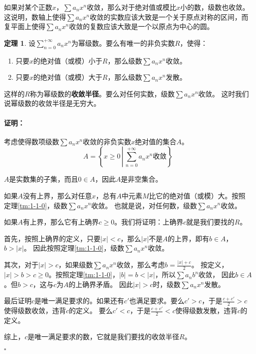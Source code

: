 \documentclass[12pt,UTF8]{ctexbook}
\theoremstyle{definition}
\newtheorem{tm}{定理}[section]
\theoremstyle{plain}
\renewenvironment{proof}{\paragraph{\textbf{证明：}}}{\hfill$\square$}
\begin{document}
如果对某个正数$x$，$\sum a_n x^n$收敛，那么对于绝对值或模比$x$小的数，级数也收敛。
这说明，数轴上使得$\sum a_n x^n$收敛的实数应该大致是一个关于原点对称的区间，而复平面上使得$\sum a_n x^n$收敛的复数应该大致是一个以原点为中心的圆。

\begin{tm}\label{tm:1-1-10}
    设$\displaystyle\sum_{n=0}^{+\infty} a_n x^n$为幂级数。要么有唯一的非负实数$R$，使得：
    \begin{enumerate}
        \item 只要$x$的绝对值（或模）小于$R$，那么级数$\sum a_n x^n$收敛。
        \item 只要$x$的绝对值（或模）大于$R$，那么级数$\sum a_n x^n$发散。
    \end{enumerate}
    这样的$R$称为幂级数的\textbf{收敛半径}。要么对任何实数，级数$\sum a_n x^n$收敛。
    这时我们说幂级数的收敛半径是无穷大。
\end{tm}

\begin{proof}
    考虑使得数项级数$\sum a_n x^n$收敛的非负实数$x$绝对值的集合$A$。
    $$A = \left\{ x \geqslant 0 \, \left| \, \sum_{n=0}^{+\infty} a_n x^n \mbox{收敛} \right. \right\} $$

    $A$是实数集的子集，而且$0\in A$，因此$A$是非空集合。

    如果$A$没有上界，那么对任意$x$，总有$A$中元素$M$比它的绝对值（或模）大。按照定理\ref{tm:1-1-0}，级数$\sum a_n x^n$收敛。
    也就是说，对任何数，级数$\sum a_n x^n$收敛。

    如果$A$有上界，那么它有上确界$c\geqslant 0$。我们将证明：上确界$c$就是我们要找的$R$。
    
    首先，按照上确界的定义，只要$|x|<c$，那么$|x|$不是$A$的上界，即有$b\in A$，$b>|x|$。
    因此按照定理\ref{tm:1-1-0}，级数$\sum a_n x^n$收敛。

    其次，对于$|x|>c$，如果级数$\sum a_n x^n$收敛，那么考虑$b = \frac{|x| + c}{2}$。
    按定义，$|x| > b > c \geqslant 0$。按照定理\ref{tm:1-1-0}，$|b| = b < |x|$，所以$\sum a_n b^n$收敛，
    因此$b \in A$。但$b>c$，这与$c$为$A$的上确界矛盾。
    因此$|x|>c$时，级数$\sum a_n x^n$发散。

    最后证明$c$是唯一满足要求的。如果还有$c'$也满足要求。要么$c'>c$，于是$\frac{c+c'}{2} > c$使得级数收敛，违背$c$的定义。
    要么$c'<c$，于是$\frac{c+c'}{2} < c$使得级数发散，违背$c$的定义。

    综上，$c$是唯一满足要求的数，它就是我们要找的收敛半径$R$。

\end{proof}
\end{document}
